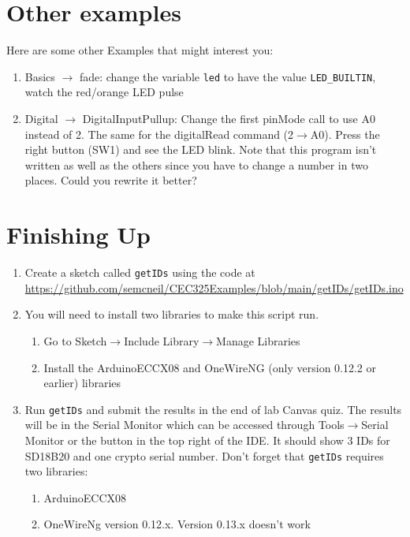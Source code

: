 \section{Other examples}
	Here are some other Examples that might interest you:
	\begin{enumerate}
		\item Basics $\rightarrow$ fade: change the variable \lstinline|led| to have the value 
            \lstinline|LED_BUILTIN|, watch the red/orange LED pulse
		\item Digital $\rightarrow$ DigitalInputPullup: Change the first pinMode call to use A0 instead of 2. The same for 
				the digitalRead command (2$\rightarrow$A0). Press the right button (SW1) and see the LED blink. 
				 Note that this program isn't written as well as the others since you have to change a number in two
				places. Could you rewrite it better?
	\end{enumerate}

\section{Finishing Up}
  \begin{enumerate}
    \item Create a sketch called \lstinline$getIDs$ using the code at \\ 
        \href{https://github.com/semcneil/CEC325Examples/blob/main/getIDs/getIDs.ino}{https://github.com/semcneil/CEC325Examples/blob/main/getIDs/getIDs.ino}
    \item You will need to install two libraries to make this script run.
    \begin{enumerate}
        \item Go to Sketch$\rightarrow$Include Library$\rightarrow$Manage Libraries 
        \item Install the ArduinoECCX08 and OneWireNG (only version 0.12.2 or earlier) libraries
    \end{enumerate}
    \item Run \lstinline$getIDs$ and submit the results in the end of lab Canvas quiz. The results will be 
                in the Serial Monitor which can be accessed through Tools$\rightarrow$Serial Monitor or the 
                button in the top right of the IDE. It should show 3 IDs for SD18B20 and one crypto serial 
                number. Don't forget that \lstinline$getIDs$ requires two libraries:
        \begin{enumerate}
            \item ArduinoECCX08
            \item OneWireNg version 0.12.x. Version 0.13.x doesn't work
        \end{enumerate}
\end{enumerate}

